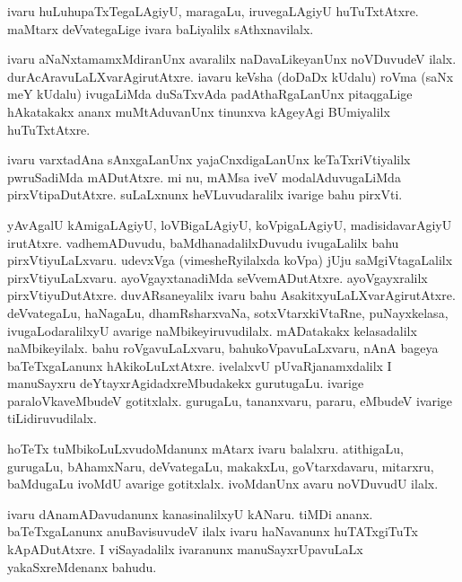 \documentclass{article}
\begin{document}
\begin{mng}%
ivaru huLuhupaTxTegaLAgiyU, maragaLu, iruvegaLAgiyU huTuTxtAtxre. maMtarx deVvategaLige ivara 
baLiyalilx sAthxnavilalx.
\end{mng}

\begin{mng}%
ivaru aNaNxtamamxMdiranUnx avaralilx naDavaLikeyanUnx noVDuvudeV ilalx. 
durAcAravuLaLXvarAgirutAtxre. iavaru keVsha (doDaDx kUdalu) roVma (saNx meY kUdalu) ivugaLiMda 
duSaTxvAda padAthaRgaLanUnx pitaqgaLige hAkatakakx ananx muMtAduvanUnx tinunxva kAgeyAgi 
BUmiyalilx huTuTxtAtxre.
\end{mng}

\begin{mng}%
ivaru varxtadAna sAnxgaLanUnx yajaCnxdigaLanUnx keTaTxriVtiyalilx pwruSadiMda mADutAtxre. mi nu, 
mAMsa iveV modalAduvugaLiMda pirxVtipaDutAtxre. suLaLxnunx heVLuvudaralilx ivarige bahu pirxVti.
\end{mng}

\begin{mng}%
yAvAgalU kAmigaLAgiyU, loVBigaLAgiyU, koVpigaLAgiyU, madisidavarAgiyU irutAtxre. vadhemADuvudu, 
baMdhanadalilxDuvudu ivugaLalilx bahu pirxVtiyuLaLxvaru. udevxVga (vimesheRyilalxda koVpa) jUju 
saMgiVtagaLalilx pirxVtiyuLaLxvaru. ayoVgayxtanadiMda seVvemADutAtxre. ayoVgayxralilx 
pirxVtiyuDutAtxre. duvARsaneyalilx ivaru bahu AsakitxyuLaLXvarAgirutAtxre. deVvategaLu, haNagaLu, 
dhamRsharxvaNa, sotxVtarxkiVtaRne, puNayxkelasa, ivugaLodaralilxyU avarige naMbikeyiruvudilalx. 
mADatakakx kelasadalilx naMbikeyilalx. bahu roVgavuLaLxvaru, bahukoVpavuLaLxvaru, nAnA bageya 
baTeTxgaLanunx hAkikoLuLxtAtxre. ivelalxvU pUvaRjanamxdalilx I manuSayxru 
deYtayxrAgidadxreMbudakekx gurutugaLu. ivarige paraloVkaveMbudeV gotitxlalx. gurugaLu, tananxvaru, 
pararu, eMbudeV ivarige tiLidiruvudilalx.
\end{mng}

\begin{mng}%
hoTeTx tuMbikoLuLxvudoMdanunx mAtarx ivaru balalxru. atithigaLu, gurugaLu, bAhamxNaru, deVvategaLu, 
makakxLu, goVtarxdavaru, mitarxru, baMdugaLu ivoMdU avarige gotitxlalx. ivoMdanUnx avaru noVDuvudU 
ilalx.
\end{mng}

\begin{mng}%
ivaru dAnamADavudanunx kanasinalilxyU kANaru. tiMDi ananx. baTeTxgaLanunx anuBavisuvudeV ilalx 
ivaru haNavanunx huTATxgiTuTx kApADutAtxre. I viSayadalilx ivaranunx manuSayxrUpavuLaLx 
yakaSxreMdenanx bahudu.
\end{mng}
\end{document}
